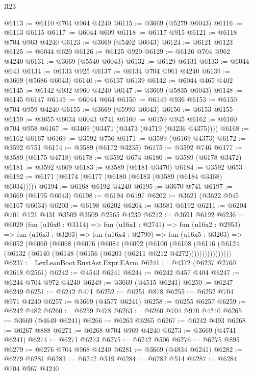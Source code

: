 \begin{lexlean}{R23}
\begin{coremodule}
@6113 := @6110 @704 @964 @4240
@6115 := @3669 (@5279 @6043)
@6116 := @6113 @6115
@6117 := @6044 @609
@6118 := @6117 @915
@6121 := @6118 @704 @963 @4240
@6123 := @3669 (@5402 @6043)
@6124 := @6121 @6123
@6125 := @6044 @620
@6126 := @6125 @920
@6129 := @6126 @704 @962 @4240
@6131 := @3669 (@5540 @6043)
@6132 := @6129 @6131
@6133 := @6044 @643
@6134 := @6133 @925
@6137 := @6134 @704 @961 @4240
@6139 := @3669 (@5686 @6043)
@6140 := @6137 @6139
@6142 := @6044 @465 @402
@6145 := @6142 @932 @960 @4240
@6147 := @3669 (@5835 @6043)
@6148 := @6145 @6147
@6149 := @6044 @664
@6150 := @6149 @936
@6153 := @6150 @704 @959 @4240
@6155 := @3669 (@5993 @6043)
@6156 := @6153 @6155
@6159 := @3655 @6034 @6043 @741
@6160 := @6159 @945
@6162 := @6160 @704 @958
@6167 := @3469 (@3471 (@3473 (@4719 (@3236 @4375))))
@6168 := @6162 @6167
@6169 := @3592 @756
@6171 := @3589 (@6169 @4373)
@6172 := @3592 @751
@6174 := @3589 (@6172 @3235)
@6175 := @3592 @746
@6177 := @3589 (@6175 @4718)
@6178 := @3592 @674
@6180 := @3589 (@6178 @3472)
@6181 := @3592 @669
@6183 := @3589 (@6181 @3470)
@6184 := @3592 @653
@6192 := @6171 (@6174 (@6177 (@6180 (@6183 (@3589 (@6184 @3468) @6034)))))
@6194 := @6168 @6192 @4240
@6195 := @3670 @741
@6197 := @3669 (@6195 @6043)
@6198 := @6194 @6197
@6202 := @3621 (@3622 @945 @6167 @6034)
@6203 := @6198 @6202
@6204 := @3681 @6192
@6211 := @6204 @701 @121 @431 @3509 @3509 @2565 @4239
@6212 := @3691 @6192
@6236 := @6029
    (fun (u16x0 : @3114) =>
    fun (u16x1 : @2741) =>
    fun (u16x2 : @2953) =>
    fun (u16x3 : @3203) =>
    fun (u16x4 : @2790) =>
    fun (u16x5 : @3203) =>
    @6052
      (@6060
        (@6068
          (@6076
            (@6084
              (@6092
                (@6100
                  (@6108
                    (@6116
                      (@6124 (@6132 (@6140 (@6148 (@6156 (@6203 (@6211 @6212 @4272))))))))))))))))
@6237 := LexLeanBoot.RustAst.Expr.EArm
@6241 := @4372 (@6237 @2760 @2618 @2561)
@6242 := @4543 @6241
@6244 := @6242 @457 @404
@6247 := @6244 @704 @972 @4240
@6249 := @3669 (@4515 @6241)
@6250 := @6247 @6249
@6251 := @6242 @471
@6252 := @6251 @878
@6255 := @6252 @704 @971 @4240
@6257 := @3669 (@4577 @6241)
@6258 := @6255 @6257
@6259 := @6242 @482
@6260 := @6259 @478
@6263 := @6260 @704 @970 @4240
@6265 := @3669 (@4649 @6241)
@6266 := @6263 @6265
@6267 := @6242 @493
@6268 := @6267 @888
@6271 := @6268 @704 @969 @4240
@6273 := @3669 (@4741 @6241)
@6274 := @6271 @6273
@6275 := @6242 @506
@6276 := @6275 @895
@6279 := @6276 @704 @968 @4240
@6281 := @3669 (@4834 @6241)
@6282 := @6279 @6281
@6283 := @6242 @519
@6284 := @6283 @514
@6287 := @6284 @704 @967 @4240

\end{coremodule}
\end{lexlean}

